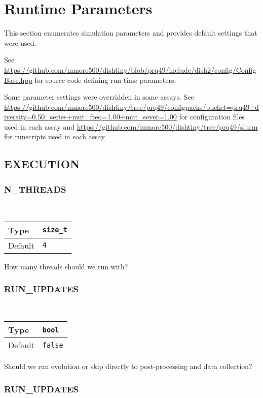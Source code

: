 \section{Runtime Parameters}

\newcommand{\confdef}[2]{
    ~\\ \begin{tabular}{|
        >{\columncolor[HTML]{C0C0C0}}l |l|}
        \hline
        Type & \texttt{#1} \\ \hline
        Default   & \texttt{#2} \\ \hline
    \end{tabular}
}

This section enumerates simulation parameters and provides default settings that were used.

See \url{https://github.com/mmore500/dishtiny/blob/prq49/include/dish2/config/ConfigBase.hpp} for source code defining run time parameters.

Some parameter settings were overridden in some assays.
See \url{https://github.com/mmore500/dishtiny/tree/prq49/configpacks/bucket=prq49+diversity=0.50_series+mut_freq=1.00+mut_sever=1.00} for configuration files used in each assay and \url{https://github.com/mmore500/dishtiny/tree/prq49/slurm} for runscripts used in each assay.

\subsection{EXECUTION}


\subsubsection{N\_THREADS}

\confdef{size\_t}{4}

How many threads should we run with?

\subsubsection{RUN\_UPDATES}

\confdef{bool}{\texttt{false}}

Should we run evolution or skip directly to post-processing and data collection?

\subsubsection{RUN\_UPDATES}

